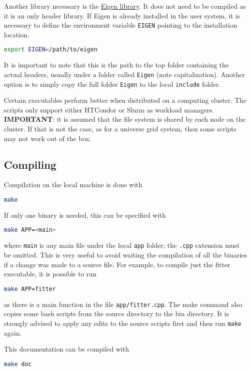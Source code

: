 \documentclass[a4paper, 11pt]{article}
\begin{document}
Another library necessary is the \href{http://eigen.tuxfamily.org/}{Eigen library}.
It does not need to be compiled as it is an only header library.
If Eigen is already installed in the user system, it is necessary to define the environment variable \texttt{EIGEN} %
pointing to the installation location.
\begin{lstlisting}[language=bash]
    export EIGEN=/path/to/eigen
\end{lstlisting}
It is important to note that this is the path to the top folder containing the actual headers, %
usually under a folder called \texttt{Eigen} (note capitalization).
Another option is to simply copy the full folder \texttt{Eigen} to the local \texttt{include} folder.

Certain executables perform better when distributed on a computing cluster.
The scripts only support either HTCondor or Slurm as workload managers.
\textbf{IMPORTANT}: it is assumed that the file system is shared by each node on the cluster.
If that is not the case, as for a universe grid system, then some scripts may not work out of the box.

\subsection{Compiling}

Compilation on the local machine is done with
\begin{lstlisting}[language=bash]
    make
\end{lstlisting}
If only one binary is needed, this can be specified with
\begin{lstlisting}[language=bash]
    make APP=<main>
\end{lstlisting}
where \texttt{main} is any main file under the local \texttt{app} folder;
the \texttt{.cpp} extension must be omitted.
This is very useful to avoid waiting the compilation of all the binaries if a change was made to a source file.
For example, to compile just the fitter executable, it is possible to run
\begin{lstlisting}[language=bash]
    make APP=fitter
\end{lstlisting}
as there is a main function in the file \texttt{app/fitter.cpp}.
The make command also copies some bash scripts from the source directory to the bin directory.
It is strongly advised to apply any edits to the source scripts first and then run \texttt{make} again.

This documentation can be compiled with
\begin{lstlisting}[language=bash]
    make doc
\end{lstlisting}
\end{document}
